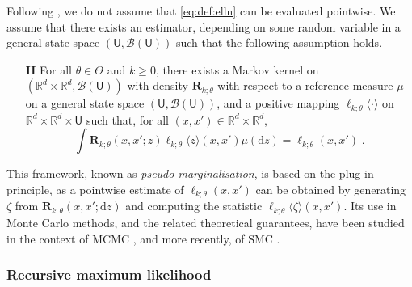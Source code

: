\documentclass[12pt]{article}
\def\Xset{\mathbb{R}^d}
\newcommand{\parvec}{\theta}
\newcommand{\parspace}{\Theta}
\newcommand{\rmd}{\ensuremath{\mathrm{d}}}
\newcommand{\eqsp}{\;}
\newcounter{hypH}
\newenvironment{hypH}{\refstepcounter{hypH}\begin{itemize}
\item[{\bf H\arabic{hypH}}]}{\end{itemize}}
\newcommand{\marginalset}{\mathsf{U}}
\newcommand{\kernelmarg}{\mathbf{R}}
\newcommand{\qg}[1]{\ell_{#1}}
\newcommand{\hatqg}[1]{\mathsf{\ell}_{#1}}
\begin{document}
Following \cite{fearnhead2008particle, olsson2011particle, gloaguen2018online, gloaguen2021pseudo}, we do not assume that  \eqref{eq:def:elln} can be evaluated pointwise.
We assume that there exists an estimator, depending on some random variable in a general state space $(\marginalset,\mathcal{B}(\marginalset))$ such that the following assumption holds.
\begin{hypH} 
\label{assum:unbiased}
For all $\parvec \in\parspace$ and $k\geqslant 0$, there exists a Markov kernel on $(\Xset\times\Xset,\mathcal{B}(\marginalset))$ with density $\kernelmarg_{k;\parvec}$ with respect to a reference measure $\mu$ on a general state space $(\marginalset,\mathcal{B}(\marginalset))$,  and a positive mapping $\hatqg{k;\parvec}\langle \cdot\rangle$ on $\Xset\times\Xset\times\marginalset$ such that, for all $(x,x')\in\Xset \times \Xset$,
\begin{equation*}
\int \kernelmarg_{k;\parvec}(x,x';z)\hatqg{k;\parvec}\langle z\rangle(x,x')\mu(\rmd z) =  \qg{k;\parvec}(x,x')\eqsp.
\end{equation*}
\end{hypH}
This framework, known as \textit{pseudo marginalisation}, is based on the plug-in principle, as a pointwise estimate of $\qg{k;\parvec}(x,x')$ can be obtained by generating $\zeta$ from $\kernelmarg_{k;\parvec}(x,x';\rmd z)$ and computing the statistic $\hatqg{k;\parvec}\langle \zeta\rangle(x,x')$. 
Its use in Monte Carlo methods, and the related theoretical guarantees, have been studied in the context of MCMC \citep{andrieu2009pseudo}, and more recently, of SMC \citep{gloaguen2021pseudo}.

\subsubsection*{Recursive maximum likelihood}
\end{document}
